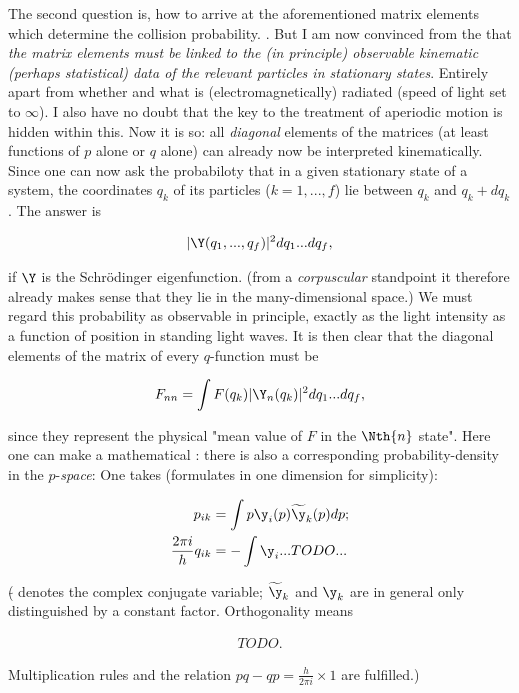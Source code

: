 \documentclass{article}
\newcommand{\uequ}[1]{
\begin{align*}
#1
\end{align*}
}
\begin{document}
The second question is, how to arrive at the aforementioned matrix elements which determine the collision probability. . But I am now convinced from the  that \textit{the matrix elements must be linked to the (in principle) observable kinematic (perhaps statistical) data of the relevant particles in stationary states}. Entirely apart from whether and what is (electromagnetically) radiated (speed of light set to $\infty$). I also have no doubt that the key to the treatment of aperiodic motion is hidden within this. Now it is so: all \textit{diagonal} elements of the matrices (at least functions of $p$ alone or $q$ alone) can already now be interpreted kinematically. Since one can now ask the probabiloty that in a given stationary state of a system, the coordinates $q_k$ of its particles ($k=1,...,f$) lie between $q_k$ and $q_k + dq_k$. The answer is
\uequ{
|\Y(q_1,...,q_f)|^2 dq_1 ... dq_f,
}
if $\Y$ is the Schr\"odinger eigenfunction. (from a \textit{corpuscular} standpoint it therefore already makes sense that they lie in the many-dimensional space.) We must regard this probability as observable in principle, exactly as the light intensity as a function of position in standing light waves. It is then clear that the diagonal elements of the matrix of every $q$-function must be
\uequ{
F_{nn} = \int F(q_k)|\Y_n(q_k)|^2 dq_1 ... dq_f,
}
since they represent the physical "mean value of $F$ in the $\Nth{n}$ state". Here one can make a mathematical : there is also a corresponding probability-density in the $p$-\textit{space}: One takes (formulates in one dimension for simplicity):
\uequ{
p_{ik} &= \int p \y_i(p)\widetilde{\y}_k(p) dp;\\
\frac{2\pi i}{h} q_{ik} &= -\int \y_i ...TODO...
}
($\widetilde{}$ denotes the complex conjugate variable; $\widetilde{\y}_k$ and $\y_k$ are in general only distinguished by a constant factor. Orthogonality means
\uequ{
TODO.
}
Multiplication rules and the relation $pq-qp=\frac{h}{2\pi i}\times 1$ are fulfilled.)
\end{document}
